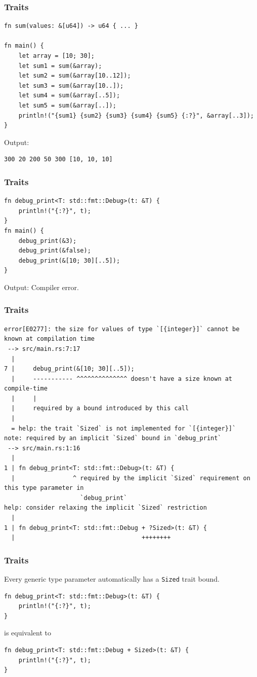 \begin{frame}[fragile]
    \frametitle{Traits}
    \begin{verbatim}
fn sum(values: &[u64]) -> u64 { ... }

fn main() {
    let array = [10; 30];
    let sum1 = sum(&array);
    let sum2 = sum(&array[10..12]);
    let sum3 = sum(&array[10..]);
    let sum4 = sum(&array[..5]);
    let sum5 = sum(&array[..]);
    println!("{sum1} {sum2} {sum3} {sum4} {sum5} {:?}", &array[..3]);
}
    \end{verbatim}
    \vfill
    Output:
    \pause
    \vfill
    \begin{verbatim}
300 20 200 50 300 [10, 10, 10]
    \end{verbatim}
\end{frame}

\begin{frame}[fragile]
    \frametitle{Traits}
    \begin{verbatim}
fn debug_print<T: std::fmt::Debug>(t: &T) {
    println!("{:?}", t);
}
fn main() {
    debug_print(&3);
    debug_print(&false);
    debug_print(&[10; 30][..5]);
}
    \end{verbatim}
    \vfill
    Output:
    \pause
    \vfill
    Compiler error.
\end{frame}

\begin{frame}[fragile]
    \frametitle{Traits}
    \begin{verbatim}
error[E0277]: the size for values of type `[{integer}]` cannot be known at compilation time
 --> src/main.rs:7:17
  |
7 |     debug_print(&[10; 30][..5]);
  |     ----------- ^^^^^^^^^^^^^^ doesn't have a size known at compile-time
  |     |
  |     required by a bound introduced by this call
  |
  = help: the trait `Sized` is not implemented for `[{integer}]`
note: required by an implicit `Sized` bound in `debug_print`
 --> src/main.rs:1:16
  |
1 | fn debug_print<T: std::fmt::Debug>(t: &T) {
  |                ^ required by the implicit `Sized` requirement on this type parameter in
                     `debug_print`
help: consider relaxing the implicit `Sized` restriction
  |
1 | fn debug_print<T: std::fmt::Debug + ?Sized>(t: &T) {
  |                                   ++++++++
    \end{verbatim}
\end{frame}

\begin{frame}[fragile]
    \frametitle{Traits}
    Every generic type parameter automatically has a \texttt{Sized} trait bound.
    \pause
    \vfill
    \begin{verbatim}
fn debug_print<T: std::fmt::Debug>(t: &T) {
    println!("{:?}", t);
}
    \end{verbatim}
    \pause
    \vfill
    is equivalent to
    \vfill
    \begin{verbatim}
fn debug_print<T: std::fmt::Debug + Sized>(t: &T) {
    println!("{:?}", t);
}
    \end{verbatim}
\end{frame}

